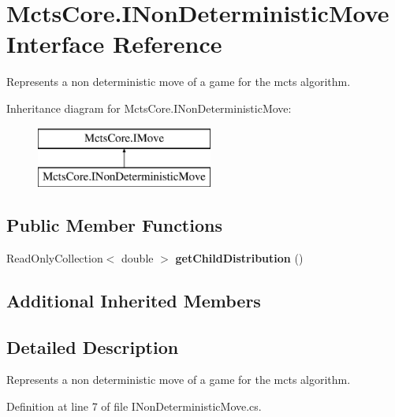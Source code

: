 \hypertarget{interface_mcts_core_1_1_i_non_deterministic_move}{}\section{Mcts\+Core.\+I\+Non\+Deterministic\+Move Interface Reference}
\label{interface_mcts_core_1_1_i_non_deterministic_move}


Represents a non deterministic move of a game for the mcts algorithm.  


Inheritance diagram for Mcts\+Core.\+I\+Non\+Deterministic\+Move\+:\begin{figure}[H]
\begin{center}
\leavevmode
\includegraphics[height=2.000000cm]{interface_mcts_core_1_1_i_non_deterministic_move}
\end{center}
\end{figure}
\subsection*{Public Member Functions}
\begin{DoxyCompactItemize}
\item 
\mbox{\label{interface_mcts_core_1_1_i_non_deterministic_move_a321f15d3c84bb9f79eb17cbf3ff7af79}} 
Read\+Only\+Collection$<$ double $>$ {\bfseries get\+Child\+Distribution} ()
\end{DoxyCompactItemize}
\subsection*{Additional Inherited Members}


\subsection{Detailed Description}
Represents a non deterministic move of a game for the mcts algorithm. 



Definition at line 7 of file I\+Non\+Deterministic\+Move.\+cs.


